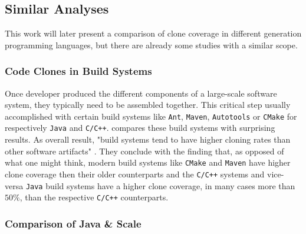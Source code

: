 

\subsection{Similar Analyses}

This work will later present a comparison of clone coverage in different generation programming languages, but there are already some studies with a similar scope.

\subsubsection{Code Clones in Build Systems}

Once developer produced the different components of a large-scale software system, they typically need to be assembled together. This critical step usually accomplished with certain build systems like \texttt{Ant}, \texttt{Maven}, \texttt{Autotools} or \texttt{CMake} for respectively \texttt{Java} and \texttt{C/C++}. \cite{mcintosh2014collecting} compares these build systems with surprising results. As overall result, "build systems tend to have higher cloning rates than other software artifacts" \cite{mcintosh2014collecting}. 
They conclude with the finding that, as opposed of what one might think, modern build systems like \texttt{CMake} and \texttt{Maven} have higher clone coverage then their older counterparts and the \texttt{C/C++} systems and vice-versa \texttt{Java} build systems have a higher clone coverage, in many cases more than $50\%$, than the respective \texttt{C/C++} counterparts.


\subsubsection{Comparison of Java \& Scale}
